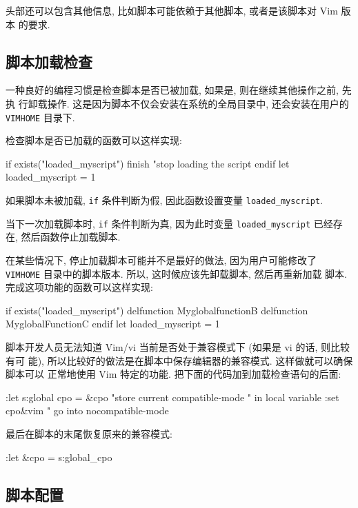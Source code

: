 头部还可以包含其他信息, 比如脚本可能依赖于其他脚本, 或者是该脚本对 Vim 版本
的要求.

\subsection{脚本加载检查}
\label{subsec:script_loaded_check}

一种良好的编程习惯是检查脚本是否已被加载, 如果是, 则在继续其他操作之前, 先执
行卸载操作.
这是因为脚本不仅会安装在系统的全局目录中, 还会安装在用户的
\texttt{VIMHOME} 目录下.

检查脚本是否已加载的函数可以这样实现:
\begin{vimcode}
if exists("loaded_myscript")
    finish "stop loading the script
endif
let loaded_myscript = 1
\end{vimcode}
如果脚本未被加载, \texttt{if} 条件判断为假, 因此函数设置变量
\texttt{loaded\_myscript}.

当下一次加载脚本时, \texttt{if} 条件判断为真, 因为此时变量
\texttt{loaded\_myscript} 已经存在, 然后函数停止加载脚本.

在某些情况下, 停止加载脚本可能并不是最好的做法, 因为用户可能修改了
\texttt{VIMHOME} 目录中的脚本版本. 所以, 这时候应该先卸载脚本, 然后再重新加载
脚本. 完成这项功能的函数可以这样实现:
\begin{vimcode}
if exists("loaded_myscript")
    delfunction MyglobalfunctionB
    delfunction MyglobalFunctionC
endif
let loaded_myscript = 1
\end{vimcode}

脚本开发人员无法知道 Vim/vi 当前是否处于兼容模式下 (如果是 vi 的话, 则比较有可
能), 所以比较好的做法是在脚本中保存编辑器的兼容模式. 这样做就可以确保脚本可以
正常地使用 Vim 特定的功能. 把下面的代码加到加载检查语句的后面:
\begin{vimcode}
:let s:global cpo = &cpo "store current compatible-mode
                         " in local variable
:set cpo&vim             " go into nocompatible-mode
\end{vimcode}
最后在脚本的末尾恢复原来的兼容模式:
\begin{vimcode}
:let &cpo = s:global_cpo
\end{vimcode}

\subsection{脚本配置}
\label{subsec:script_configuration}

